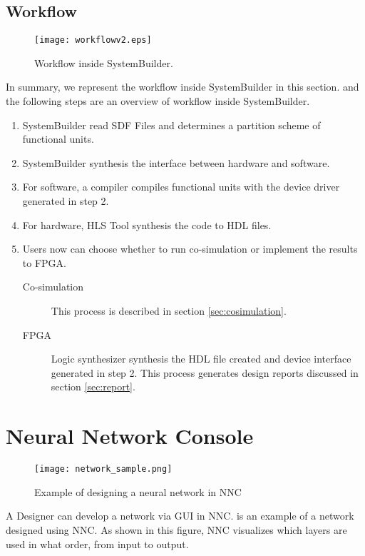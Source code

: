 \subsection{Workflow} \label{sec:workflow}

\begin{figure}[tb]
\centering
\texttt{[image: workflowv2.eps]}
\caption{Workflow inside SystemBuilder.}
\label{fig:systembuilder}
\end{figure}

In summary, we represent the workflow inside SystemBuilder in this section.  and the following steps are an overview of workflow inside SystemBuilder.

\begin{enumerate}
    \item SystemBuilder read SDF Files and determines a partition scheme of functional units.
    \item SystemBuilder synthesis the interface between hardware and software.
    \item For software, a compiler compiles functional units with the device driver generated in step 2.
    \item For hardware, HLS Tool synthesis the code to HDL files.
    \item Users now can choose whether to run co-simulation or implement the results to FPGA.
    \begin{description}
    \item [Co-simulation] This process is described in section \ref{sec:cosimulation}.
    \item [FPGA] Logic synthesizer synthesis the HDL file created and device interface generated in step 2. This process generates design reports discussed in section \ref{sec:report}.
    \end{description}
\end{enumerate}

\section{Neural Network Console} \label{sec:nnc}

\begin{figure}[tbp]
  \centering
  \texttt{[image: network\_sample.png]}
  \caption{Example of designing a neural network in NNC}%
  \label{fig:network_sample}
\end{figure}

A Designer can develop a network via GUI in NNC.  is an example of a network designed using NNC. As shown in this figure, NNC visualizes which layers are used in what order, from input to output.

